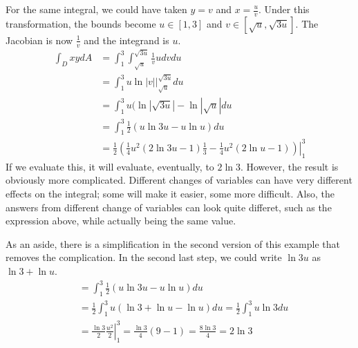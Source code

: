 \documentclass[fleqn,letterpaper]{report}
\begin{document}
\begin{example}
For the same integral, we could have taken $y=v$ and $x=
\frac{u}{v}$. Under this transformation, the bounds become $u
\in [1,3]$ and $v \in [\sqrt{u}, \sqrt{3u}]$. The Jacobian is
now $\frac{1}{v}$ and the integrand is $u$.
\begin{align*}
\int_D xy dA & = \int_1^3 \int_{\sqrt{u}}^{\sqrt{3u}}
\frac{1}{v} u dv du \\
& = \int_1^3 u \ln |v| \bigg|_{\sqrt{u}}^{\sqrt{3u}}
du \\
& = \int_1^3 u (\ln |\sqrt{3u}| - \ln |\sqrt{u}|du \\
& = \int_1^3 \frac{1}{2} (u \ln 3u - u \ln u) du \\
& = \left. \frac{1}{2} \left(\frac{1}{4} u^2 (2 \ln 3u - 1)
\frac{1}{3} - \frac{1}{4} u^2 (2 \ln u - 1) \right) \right|_1^3 
\end{align*}
If we evaluate this, it will evaluate, eventually, to $2 \ln
3$. However, the result is obviously more complicated.
Different changes of variables can have very different effects
on the integral; some will make it easier, some more
difficult. Also, the answers from different change of
variables can look quite differet, such as the expression
above, while actually being the same value.

As an aside, there is a simplification in the second version
of this example that removes the complication. In the second
last step, we could write $\ln 3u$ as $\ln 3 + \ln u$. 
\begin{align*}
& = \int_1^3 \frac{1}{2} (u \ln 3u - u \ln u) du \\
& = \frac{1}{2} \int_1^3 u (\ln 3 + \ln u - \ln u) du =
\frac{1}{2} \int_1^3 u \ln 3 du \\
& = \left. \frac{\ln 3}{2} \frac{u^2}{2} \right|_1^3 =
\frac{\ln 3}{4} (9-1) = \frac{8 \ln 3}{4} = 2 \ln 3
\end{align*}
\end{example}
\end{document}
